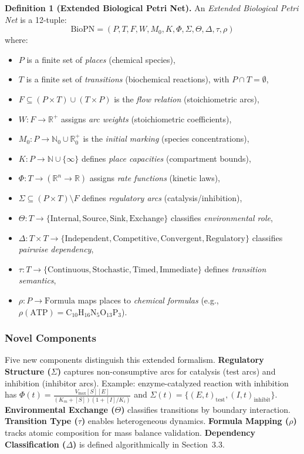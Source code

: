 \documentclass[twocolumn,11pt]{article}
\begin{document}
\textbf{Definition 1 (Extended Biological Petri Net).}
An \emph{Extended Biological Petri Net} is a 12-tuple:
\begin{equation}
\text{BioPN} = (P, T, F, W, M_0, K, \Phi, \Sigma, \Theta, \Delta, \tau, \rho)
\end{equation}
where:
\begin{itemize}[leftmargin=*,itemsep=0pt,parsep=0pt,topsep=3pt]
\item $P$ is a finite set of \emph{places} (chemical species),
\item $T$ is a finite set of \emph{transitions} (biochemical reactions), with $P \cap T = \emptyset$,
\item $F \subseteq (P \times T) \cup (T \times P)$ is the \emph{flow relation} (stoichiometric arcs),
\item $W: F \to \mathbb{R}^+$ assigns \emph{arc weights} (stoichiometric coefficients),
\item $M_0: P \to \mathbb{N}_0 \cup \mathbb{R}_0^+$ is the \emph{initial marking} (species concentrations),
\item $K: P \to \mathbb{N} \cup \{\infty\}$ defines \emph{place capacities} (compartment bounds),
\item $\Phi: T \to (\mathbb{R}^n \to \mathbb{R})$ assigns \emph{rate functions} (kinetic laws),
\item $\Sigma \subseteq (P \times T) \setminus F$ defines \emph{regulatory arcs} (catalysis/inhibition),
\item $\Theta: T \to \{\text{Internal},\allowbreak \text{Source},\allowbreak \text{Sink},\allowbreak \text{Exchange}\}$ classifies \emph{environmental role},
\item $\Delta: T \times T \to \{\text{Independent},\allowbreak \text{Competitive},\allowbreak \text{Convergent},\allowbreak \text{Regulatory}\}$ classifies \emph{pairwise dependency},
\item $\tau: T \to \{\text{Continuous},\allowbreak \text{Stochastic},\allowbreak \text{Timed},\allowbreak \text{Immediate}\}$ defines \emph{transition semantics},
\item $\rho: P \to \text{Formula}$ maps places to \emph{chemical formulas} (e.g., $\rho(\text{ATP}) = \text{C}_{10}\text{H}_{16}\text{N}_5\text{O}_{13}\text{P}_3$).
\end{itemize}

\subsubsection{Novel Components}
Five new components distinguish this extended formalism. \textbf{Regulatory Structure ($\Sigma$)} captures non-consumptive arcs for catalysis (test arcs) and inhibition (inhibitor arcs). Example: enzyme-catalyzed reaction with inhibition has $\Phi(t) = \frac{V_{\max} [S] [E]}{(K_m + [S])(1 + [I]/K_i)}$ and $\Sigma(t) = \{(E,t)_{\text{test}}, (I,t)_{\text{inhibit}}\}$.
\textbf{Environmental Exchange ($\Theta$)} classifies transitions by boundary interaction.
\textbf{Transition Type ($\tau$)} enables heterogeneous dynamics.
\textbf{Formula Mapping ($\rho$)} tracks atomic composition for mass balance validation.
\textbf{Dependency Classification ($\Delta$)} is defined algorithmically in Section~3.3.
\end{document}
